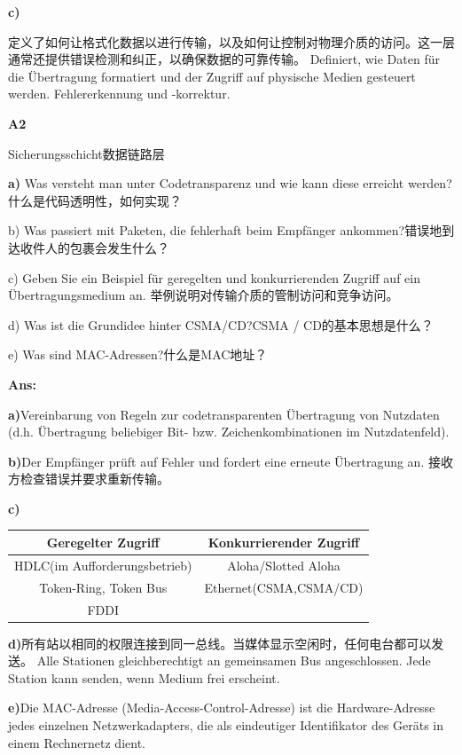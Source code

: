 \documentclass[fleqn]{article}
\begin{document}
\textbf{c)}

定义了如何让格式化数据以进行传输，以及如何让控制对物理介质的访问。这一层通常还提供错误检测和纠正，以确保数据的可靠传输。
Definiert, wie Daten für die Übertragung formatiert und der Zugriff auf physische Medien gesteuert werden. Fehlererkennung und -korrektur.

\noindent\textbf{A2}

Sicherungsschicht数据链路层

\textbf{a)} Was versteht man unter Codetransparenz und wie kann diese erreicht werden?什么是代码透明性，如何实现？

b) Was passiert mit Paketen, die fehlerhaft beim Empfänger ankommen?错误地到达收件人的包裹会发生什么？

c) Geben Sie ein Beispiel für geregelten und konkurrierenden Zugriff auf ein Übertragungsmedium an.
举例说明对传输介质的管制访问和竞争访问。

d) Was ist die Grundidee hinter CSMA/CD?CSMA / CD的基本思想是什么？

e) Was sind MAC-Adressen?什么是MAC地址？

\textbf{Ans:}

\textbf{a)}Vereinbarung von Regeln zur codetransparenten Übertragung von Nutzdaten (d.h. Übertragung beliebiger Bit- bzw. Zeichenkombinationen im Nutzdatenfeld).

\textbf{b)}Der Empfänger prüft auf Fehler und fordert eine erneute Übertragung an. 接收方检查错误并要求重新传输。

\textbf{c)}

\begin{center}
    \begin{tabular}{c|c}
        Geregelter Zugriff&Konkurrierender Zugriff\\
        \hline
        HDLC(im Aufforderungsbetrieb)&Aloha/Slotted Aloha\\
        Token-Ring, Token Bus&Ethernet(CSMA,CSMA/CD)\\
        FDDI
    \end{tabular}
\end{center}

\textbf{d)}所有站以相同的权限连接到同一总线。当媒体显示空闲时，任何电台都可以发送。
Alle Stationen gleichberechtigt an gemeinsamen Bus angeschlossen. 
Jede Station kann senden, wenn Medium frei erscheint.

\textbf{e)}Die MAC-Adresse (Media-Access-Control-Adresse) ist die Hardware-Adresse jedes einzelnen Netzwerkadapters, die als eindeutiger Identifikator des Geräts in einem Rechnernetz dient.
\end{document}
